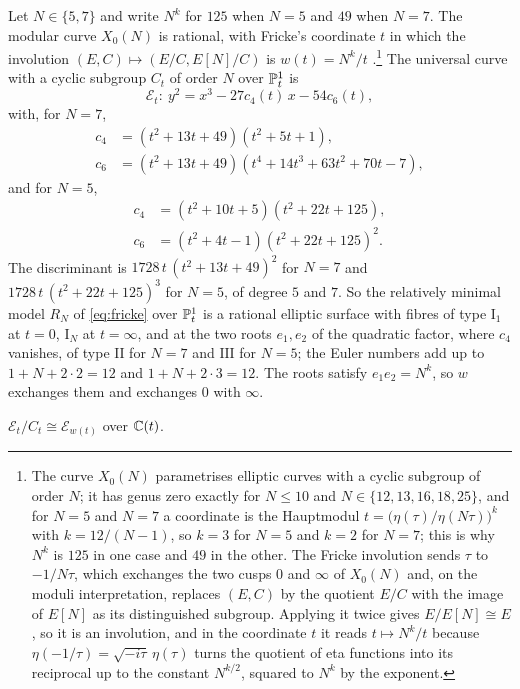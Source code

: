 Let $N\in\{5,7\}$ and write $N^{k}$ for $125$ when $N=5$ and $49$ when $N=7$. The modular curve $X_{0}(N)$ is rational, with Fricke's coordinate $t$ in which the involution $(E,C)\mapsto(E/C,E[N]/C)$ is $w(t)=N^{k}/t$ \cite[\S7.6]{vGS25}.\footnote{The curve $X_{0}(N)$ parametrises elliptic curves with a cyclic subgroup of order $N$; it has genus zero exactly for $N\le10$ and $N\in\{12,13,16,18,25\}$, and for $N=5$ and $N=7$ a coordinate is the Hauptmodul $t=\bigl(\eta(\tau)/\eta(N\tau)\bigr)^{k}$ with $k=12/(N-1)$, so $k=3$ for $N=5$ and $k=2$ for $N=7$; this is why $N^{k}$ is $125$ in one case and $49$ in the other. The Fricke involution sends $\tau$ to $-1/N\tau$, which exchanges the two cusps $0$ and $\infty$ of $X_{0}(N)$ and, on the moduli interpretation, replaces $(E,C)$ by the quotient $E/C$ with the image of $E[N]$ as its distinguished subgroup. Applying it twice gives $E/E[N]\cong E$, so it is an involution, and in the coordinate $t$ it reads $t\mapsto N^{k}/t$ because $\eta(-1/\tau)=\sqrt{-i\tau}\,\eta(\tau)$ turns the quotient of eta functions into its reciprocal up to the constant $N^{k/2}$, squared to $N^{k}$ by the exponent.} The universal curve with a cyclic subgroup $C_{t}$ of order $N$ over $\mathbb{P}^{1}_{t}$ is
\begin{equation}\label{eq:fricke}
\mathcal{E}_{t}\colon\ y^{2}=x^{3}-27c_{4}(t)\,x-54c_{6}(t),
\end{equation}
with, for $N=7$,
\begin{align*}
c_{4}&=(t^{2}+13t+49)(t^{2}+5t+1),\\
c_{6}&=(t^{2}+13t+49)(t^{4}+14t^{3}+63t^{2}+70t-7),
\end{align*}
and for $N=5$,
\begin{align*}
c_{4}&=(t^{2}+10t+5)(t^{2}+22t+125),\\
c_{6}&=(t^{2}+4t-1)(t^{2}+22t+125)^{2}.
\end{align*}
The discriminant is $1728\,t\,(t^{2}+13t+49)^{2}$ for $N=7$ and $1728\,t\,(t^{2}+22t+125)^{3}$ for $N=5$, of degree $5$ and $7$. So the relatively minimal model $R_{N}$ of \eqref{eq:fricke} over $\mathbb{P}^{1}_{t}$ is a rational elliptic surface with fibres of type $\mathrm{I}_{1}$ at $t=0$, $\mathrm{I}_{N}$ at $t=\infty$, and at the two roots $e_{1},e_{2}$ of the quadratic factor, where $c_{4}$ vanishes, of type $\mathrm{II}$ for $N=7$ and $\mathrm{III}$ for $N=5$; the Euler numbers add up to $1+N+2\cdot2=12$ and $1+N+2\cdot3=12$. The roots satisfy $e_{1}e_{2}=N^{k}$, so $w$ exchanges them and exchanges $0$ with $\infty$.

\begin{lemma}\label{lem:fricke}
$\mathcal{E}_{t}/C_{t}\cong\mathcal{E}_{w(t)}$ over $\mathbb{C}(t)$.
\end{lemma}

